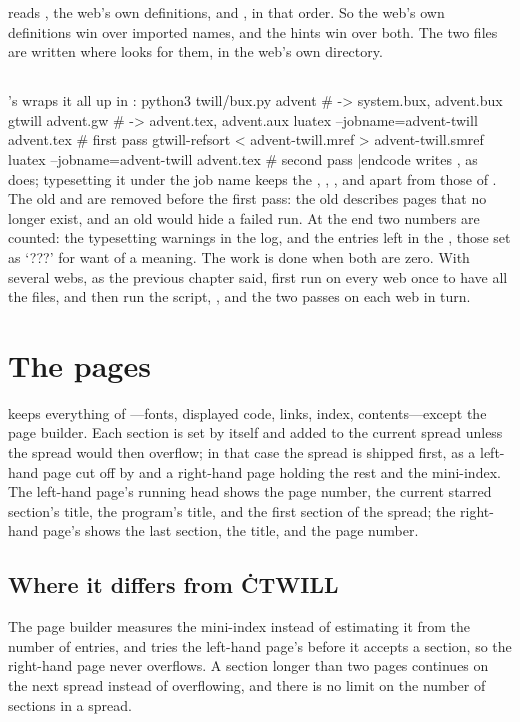  reads , the web's own definitions, and
, in that order. So the web's own definitions win over imported
names, and the hints win over both. The two files are written where 
looks for them, in the web's own directory.

\section{}
's  wraps it all up in :
\begincode
python3 twill/bux.py advent              # -> system.bux, advent.bux
gtwill advent.gw                         # -> advent.tex, advent.aux
luatex --jobname=advent-twill advent.tex # first pass
gtwill-refsort < advent-twill.mref > advent-twill.smref
luatex --jobname=advent-twill advent.tex # second pass
|endcode
 writes , as  does; typesetting it under
the job name  keeps the , , , and
 apart from those of . The old  and 
are removed before the first pass: the old  describes pages that no
longer exist, and an old  would hide a failed run. At the end two
numbers are counted: the typesetting warnings in the log, and the
 entries left in the , those set as `???' for
want of a meaning. The work is done when both are zero. With several webs, as the
previous chapter said, first run  on every web once to have all the
 files, and then run the script, , and the two passes on each
web in turn.

\chapter{The pages}
\noindent {} keeps everything of ---fonts,
displayed code, links, index, contents---except the page builder. Each section is
set by itself and added to the current spread unless the spread would then
overflow; in that case the spread is shipped first, as a left-hand page cut off
by  and a right-hand page holding the rest and the mini-index. The
left-hand page's running head shows the page number, the current starred
section's title, the program's title, and the first section of the spread; the
right-hand page's shows the last section, the title, and the page number.

\section{Where it differs from \.{CTWILL}}
\bull The page builder measures the mini-index instead of estimating it from the
number of entries, and tries the left-hand page's  before it
accepts a section, so the right-hand page never overflows. A section longer than
two pages continues on the next spread instead of overflowing, and there is no
limit on the number of sections in a spread.

